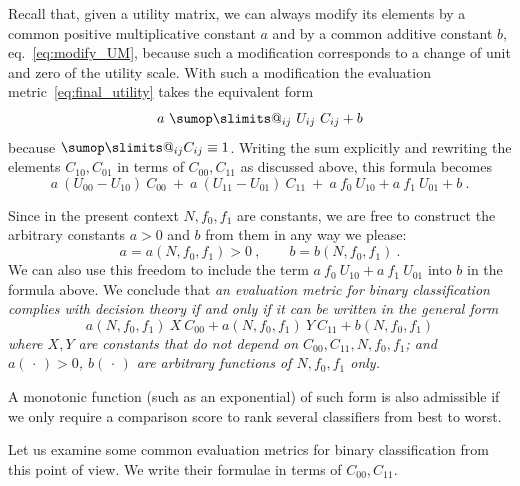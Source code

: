 \documentclass[\ifafour a4paper,12pt,\else a5paper,10pt,\fi%
onecolumn,oneside,article,%
british%
]{memoir}
\makeatletter
\theoremstyle{remark}
\theoremstyle{innote}
\def\sum{\DOTSI\sumop\slimits@}
\newcommand*{\dotv}{\mathord{\,\cdot\,}}%
\renewcommand*{\|}[1][]{\nonscript\:#1\vert\nonscript\:\mathopen{}}
\newcommand*{\eqn}{eq.}%
\newcommand*{\cx}{X}
\newcommand*{\cy}{Y}
\makeatother
\begin{document}
Recall that, given a utility matrix, we can always modify its elements by a common positive multiplicative constant $a$ and by a common additive constant $b$, \eqn~\eqref{eq:modify_UM}, because such a modification corresponds to a change of unit and zero of the utility scale. With such a modification the evaluation metric~\eqref{eq:final_utility} takes the equivalent form
\begin{equation}
  \label{eq:final_utility_modified}
 a\ \sum_{ij} \ U_{ij}\ C_{ij} + b
\end{equation}
because $\sum_{ij} C_{ij} \equiv 1$. Writing the sum explicitly and rewriting the elements $C_{10}, C_{01}$ in terms of $C_{00}, C_{11}$ as discussed above, this formula becomes 
\begin{equation}
  \label{eq:final_utility_binary}
    a\ (U_{00} - U_{10})\ C_{00} \ + \ 
    a\ (U_{11} - U_{01})\ C_{11} \ + \ 
    a\ f_{0}\ U_{10} + a\ f_{1}\ U_{01} +  b \ .
\end{equation}

Since in the present context $N, f_{0}, f_{1}$ are constants, we are free to construct the arbitrary constants $a > 0$ and $b$ from them in any way we please:
\begin{equation}
  \label{eq:constants_functions}
  a = a(N, f_{0}, f_{1}) > 0\ , \qquad
  b = b(N, f_{0}, f_{1}) \ .
\end{equation}
We can also use this freedom to include the term $a\ f_{0}\ U_{10} + a\ f_{1}\ U_{01}$ into $b$ in the formula above. We conclude that \emph{an evaluation metric for binary classification complies with decision theory if and only if it can be written in the general form}
\begin{equation}
  \label{eq:general_valuation_metric}
  a(N, f_{0}, f_{1})\ \cx\ C_{00} +
  a(N, f_{0}, f_{1})\ \cy\  C_{11} +
  b(N, f_{0}, f_{1})
\end{equation}
\emph{where $\cx,\cy$ are constants that do not depend on $C_{00}, C_{11}, N, f_{0}, f_{1}$; and $a(\dotv)>0$, $b(\dotv)$ are arbitrary functions of $N, f_{0}, f_{1}$ only.}

A monotonic function (such as an exponential) of such form is also admissible if we only require a comparison score to rank several classifiers from best to worst.

Let us examine some common evaluation metrics for binary classification from this point of view. We write their formulae in terms of $C_{00}, C_{11}$.
\end{document}
